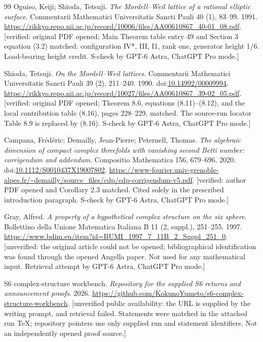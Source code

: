 \documentclass[11pt,a4paper]{article}
\theoremstyle{plain}
\theoremstyle{definition}
\begin{document}
\begin{thebibliography}{99}
Oguiso, Keiji; Shioda, Tetsuji. \emph{The Mordell--Weil lattice of a rational elliptic surface}. Commentarii Mathematici Universitatis Sancti Pauli 40 (1), 83--99. 1991. \url{https://rikkyo.repo.nii.ac.jp/record/10006/files/AA00610867_40-01_08.pdf}. [verified: original PDF opened; Main Theorem table entry 49 and Section 3 equation (3.2) matched: configuration IV*, III, I1, rank one, generator height 1/6. Load-bearing height credit. S-check by GPT-6 Astra, ChatGPT Pro mode.]

Shioda, Tetsuji. \emph{On the Mordell--Weil lattices}. Commentarii Mathematici Universitatis Sancti Pauli 39 (2), 211--240. 1990. doi:\url{10.14992/00009994}. \url{https://rikkyo.repo.nii.ac.jp/record/10027/files/AA00610867_39-02_05.pdf}. [verified: original PDF opened; Theorem 8.6, equations (8.11)--(8.12), and the local contribution table (8.16), pages 228--229, matched. The source-run locator Table 8.9 is replaced by (8.16). S-check by GPT-6 Astra, ChatGPT Pro mode.]

Campana, Fr{\'e}d{\'e}ric; Demailly, Jean-Pierre; Peternell, Thomas. \emph{The algebraic dimension of compact complex threefolds with vanishing second Betti number: corrigendum and addendum}. Compositio Mathematica 156, 679--696. 2020. doi:\url{10.1112/S0010437X19007802}. \url{https://www-fourier.univ-grenoble-alpes.fr/~demailly/source_files/cdp/cdp-corrigendum-v5.pdf}. [verified: author PDF opened and Corollary 2.3 matched. Cited solely in the prescribed introduction paragraph. S-check by GPT-6 Astra, ChatGPT Pro mode.]

Gray, Alfred. \emph{A property of a hypothetical complex structure on the six sphere}. Bollettino della Unione Matematica Italiana B 11 (2, suppl.), 251--255. 1997. \url{https://www.bdim.eu/item?id=BUMI_1997_7_11B_2_Suppl_251_0}. [unverified: the original article could not be opened; bibliographical identification was found through the opened Angella paper. Not used for any mathematical input. Retrieval attempt by GPT-6 Astra, ChatGPT Pro mode.]

{S6 complex-structure workbench}. \emph{Repository for the supplied S6 returns and announcement proofs}. 2026. \url{https://github.com/KokunoYumeto/s6-complex-structure-workbench}. [unverified public availability: the URL is supplied by the writing prompt, and retrieval failed. Statements were matched in the attached run TeX; repository pointers use only supplied run and statement identifiers. Not an independently opened proof source.]


\end{thebibliography}
\end{document}
